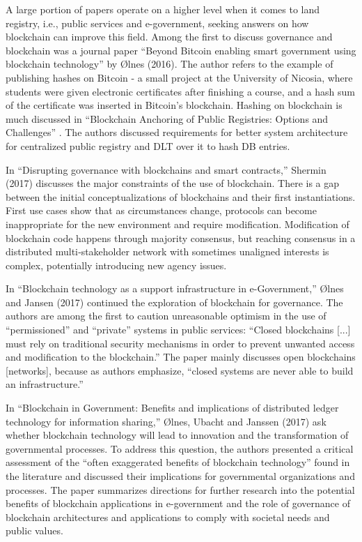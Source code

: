 \begin{multicols}{2}
A large portion of papers operate on a higher level when it comes to land registry, i.e., public services and e-government, seeking answers on how blockchain can improve this field. Among the first to discuss governance and blockchain was a journal paper “Beyond Bitcoin enabling smart government using blockchain technology” \cite{art1-key05} by Ølnes (2016). The author refers to the example of publishing hashes on Bitcoin - a small project at the University of Nicosia, where students were given electronic certificates after finishing a course, and a hash sum of the certificate was inserted in Bitcoin’s blockchain. Hashing on blockchain is much discussed in “Blockchain Anchoring of Public Registries: Options and Challenges” \cite{art1-key06}. The authors discussed  requirements for better system architecture for centralized public registry and DLT over it to hash DB entries.

In “Disrupting governance with blockchains and smart contracts,” \cite{art1-key07} Shermin (2017) discusses the major constraints of the use of blockchain. There is a gap between the initial conceptualizations of blockchains and their first instantiations. First use cases show that as circumstances change, protocols can become inappropriate for the new environment and require modification. Modification of blockchain code happens through majority consensus, but reaching consensus in a distributed multi‐stakeholder network with sometimes unaligned interests is complex, potentially introducing new agency issues.

In “Blockchain technology as a support infrastructure in e-Government,” \cite{art1-key08} Ølnes and Jansen (2017) continued the exploration of blockchain for governance. The authors are among the first to caution unreasonable optimism in the use of “permissioned” and “private” systems in public services: “Closed blockchains [...] must rely on traditional security mechanisms in order to prevent unwanted access and modification to the blockchain.” The paper mainly discusses open blockchains [networks], because as authors emphasize, “closed systems are never able to build an infrastructure.”

In “Blockchain in Government: Benefits and implications of distributed ledger technology for information sharing,” \cite{art1-key09} Ølnes, Ubacht and Janssen (2017) ask whether blockchain technology will lead to innovation and the transformation of governmental processes. To address this question, the authors presented a critical assessment of the “often exaggerated benefits of blockchain technology” found in the literature and discussed their implications for governmental organizations and processes. The paper summarizes directions for further research into the potential benefits of blockchain applications in e-government and the role of governance of blockchain architectures and applications to comply with societal needs and public values.


\end{multicols}
